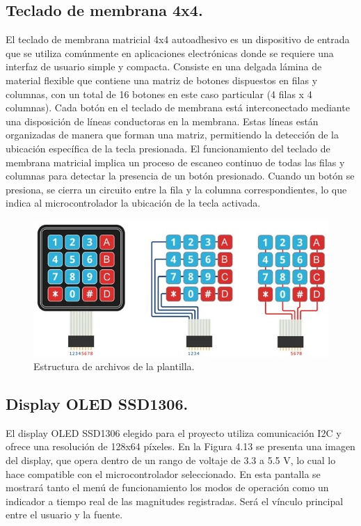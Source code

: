 \subsection{Teclado de membrana 4x4.}
El teclado de membrana matricial 4x4 autoadhesivo es un dispositivo de entrada que se utiliza comúnmente en aplicaciones electrónicas donde se requiere una interfaz de usuario simple y compacta. Consiste en una delgada lámina de material flexible que contiene una matriz de botones dispuestos en filas y columnas, con un total de 16 botones en este caso particular (4 filas x 4 columnas).
Cada botón en el teclado de membrana está interconectado mediante una disposición de líneas conductoras en la membrana. Estas líneas están organizadas de manera que forman una matriz, permitiendo la detección de la ubicación específica de la tecla presionada. El funcionamiento del teclado de membrana matricial implica un proceso de escaneo continuo de todas las filas y columnas para detectar la presencia de un botón presionado. Cuando un botón se presiona, se cierra un circuito entre la fila y la columna correspondientes, lo que indica al microcontrolador la ubicación de la tecla activada.

\begin{figure}
    \centering
    \includegraphics[scale=0.5]{./imagenes/Teclado Matricial 4x4_2.jpg}
    \caption{Estructura de archivos de la plantilla.}
    \label{F:teclado4x4}
\end{figure}

\subsection{Display OLED SSD1306.}
El display OLED SSD1306 elegido para el proyecto utiliza comunicación I2C y ofrece una resolución de 128x64 píxeles. En la Figura 4.13 se presenta una imagen del display, que opera dentro de un rango de voltaje de 3.3 a 5.5 V, lo cual lo hace compatible con el microcontrolador seleccionado. En esta pantalla se mostrará tanto el menú de funcionamiento los modos de operación como un indicador a tiempo real de las magnitudes registradas. Será el vínculo principal entre el usuario y la fuente.

